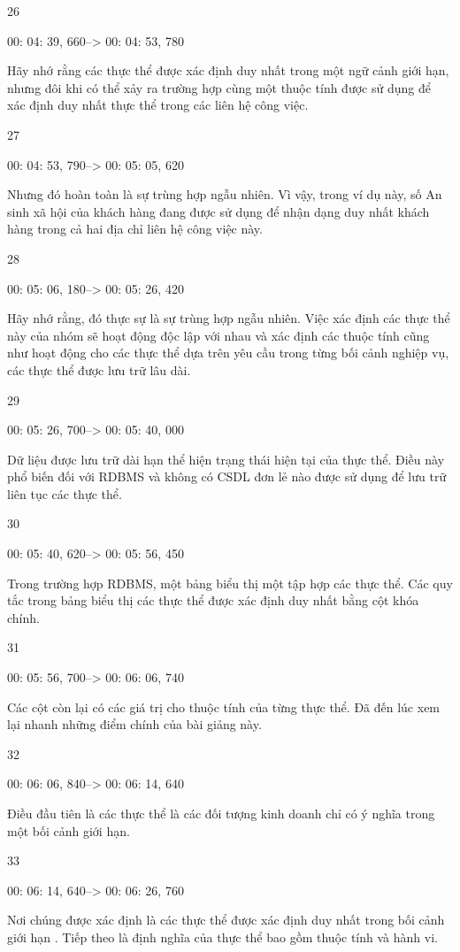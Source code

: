 26

00: 04: 39, 660--> 00: 04: 53, 780

Hãy nhớ rằng các thực thể được xác định duy nhất trong một ngữ cảnh giới hạn, nhưng đôi khi có thể xảy ra trường hợp cùng một thuộc tính được sử dụng để xác định duy nhất thực thể trong các liên hệ công việc.

27

00: 04: 53, 790--> 00: 05: 05, 620

Nhưng đó hoàn toàn là sự trùng hợp ngẫu nhiên. Vì vậy, trong ví dụ này, số An sinh xã hội của khách hàng đang được sử dụng để nhận dạng duy nhất khách hàng trong cả hai địa chỉ liên hệ công việc này.

28

00: 05: 06, 180--> 00: 05: 26, 420

Hãy nhớ rằng, đó thực sự là sự trùng hợp ngẫu nhiên. Việc xác định các thực thể này của nhóm sẽ hoạt động độc lập với nhau và xác định các thuộc tính cũng như hoạt động cho các thực thể dựa trên yêu cầu trong từng bối cảnh nghiệp vụ, các thực thể được lưu trữ lâu dài.

29

00: 05: 26, 700--> 00: 05: 40, 000

Dữ liệu được lưu trữ dài hạn thể hiện trạng thái hiện tại của thực thể. Điều này phổ biến đối với RDBMS và không có CSDL đơn lẻ nào được sử dụng để lưu trữ liên tục các thực thể.

30

00: 05: 40, 620--> 00: 05: 56, 450

Trong trường hợp RDBMS, một bảng biểu thị một tập hợp các thực thể. Các quy tắc trong bảng biểu thị các thực thể được xác định duy nhất bằng cột khóa chính.

31

00: 05: 56, 700--> 00: 06: 06, 740

Các cột còn lại có các giá trị cho thuộc tính của từng thực thể. Đã đến lúc xem lại nhanh những điểm chính của bài giảng này.

32

00: 06: 06, 840--> 00: 06: 14, 640

Điều đầu tiên là các thực thể là các đối tượng kinh doanh chỉ có ý nghĩa trong một bối cảnh giới hạn.

33

00: 06: 14, 640--> 00: 06: 26, 760

Nơi chúng được xác định là các thực thể được xác định duy nhất trong bối cảnh giới hạn . Tiếp theo là định nghĩa của thực thể bao gồm thuộc tính và hành vi.


